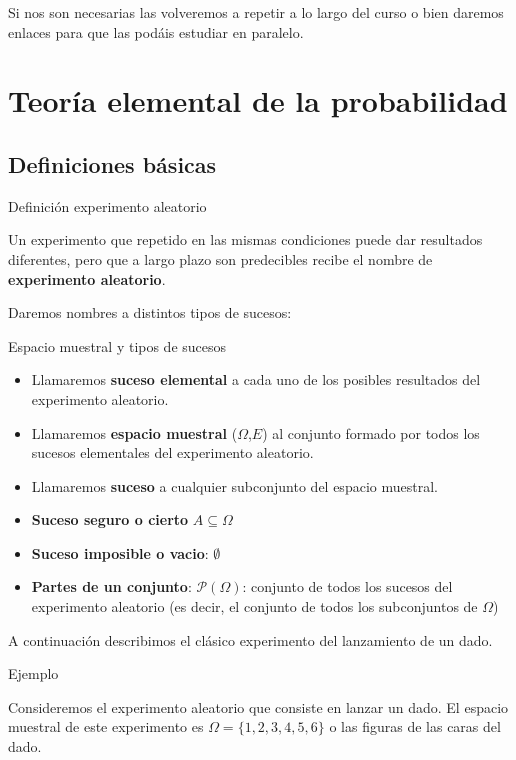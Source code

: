 \documentclass[
  letterpaper,
  DIV=11,
  numbers=noendperiod]{scrreprt}
\providecommand{\tightlist}{%
  \setlength{\itemsep}{0pt}\setlength{\parskip}{0pt}}\usepackage{longtable,booktabs,array}
\begin{document}
Si nos son necesarias las volveremos a repetir a lo largo del curso o
bien daremos enlaces para que las podáis estudiar en paralelo.

\chapter{Teoría elemental de la
probabilidad}\label{teoruxeda-elemental-de-la-probabilidad}

\section{Definiciones básicas}\label{definiciones-buxe1sicas}

Definición experimento aleatorio

Un experimento que repetido en las mismas condiciones puede dar
resultados diferentes, pero que a largo plazo son predecibles recibe el
nombre de \textbf{experimento aleatorio}.

Daremos nombres a distintos tipos de sucesos:

Espacio muestral y tipos de sucesos

\begin{itemize}
\tightlist
\item
  Llamaremos \textbf{suceso elemental} a cada uno de los posibles
  resultados del experimento aleatorio.
\item
  Llamaremos \textbf{espacio muestral} (\(\Omega\),\(E\)) al conjunto
  formado por todos los sucesos elementales del experimento aleatorio.
\item
  Llamaremos \textbf{suceso} a cualquier subconjunto del espacio
  muestral.
\item
  \textbf{Suceso seguro o cierto} \(A\subseteq \Omega\)
\item
  \textbf{Suceso imposible o vacio}: \(\emptyset\)
\item
  \textbf{Partes de un conjunto}: \(\mathcal{P}(\Omega)\): conjunto de
  todos los sucesos del experimento aleatorio (es decir, el conjunto de
  todos los subconjuntos de \(\Omega\))
\end{itemize}

A continuación describimos el clásico experimento del lanzamiento de un
dado.

Ejemplo

Consideremos el experimento aleatorio que consiste en lanzar un dado. El
espacio muestral de este experimento es \(\Omega=\{1,2,3,4,5,6\}\) o las
figuras de las caras del dado.
\end{document}
